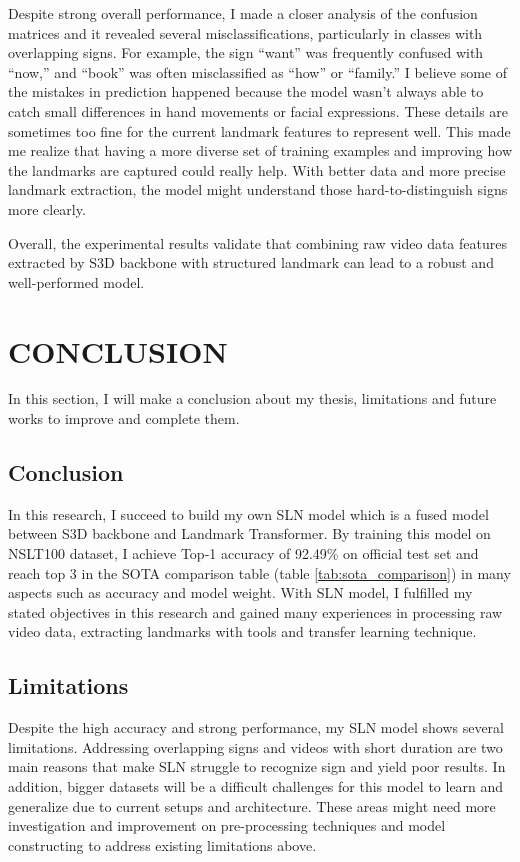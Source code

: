 \documentclass{article}
\begin{document}
\vspace{0.5cm}

Despite strong overall performance, I made a closer analysis of the confusion matrices and it revealed several misclassifications, particularly in classes with overlapping signs. For example, the sign “want” was frequently confused with “now,” and “book” was often misclassified as “how” or “family.” I believe some of the mistakes in prediction happened because the model wasn’t always able to catch small differences in hand movements or facial expressions. These details are sometimes too fine for the current landmark features to represent well. This made me realize that having a more diverse set of training examples and improving how the landmarks are captured could really help. With better data and more precise landmark extraction, the model might understand those hard-to-distinguish signs more clearly.

\vspace{0.5cm}

Overall, the experimental results validate that combining raw video data features extracted by S3D backbone \cite{xie2017rethinking} with structured landmark can lead to a robust and well-performed model.

\section{CONCLUSION}

In this section, I will make a conclusion about my thesis, limitations and future works to improve and complete them.

\subsection{Conclusion}
In this research, I succeed to build my own SLN model which is a fused model between S3D backbone and Landmark Transformer. By training this model on NSLT100 dataset, I achieve Top-1 accuracy of 92.49\% on official test set and reach top 3 in the SOTA comparison table (table \ref{tab:sota_comparison}) in many aspects such as accuracy and model weight. With SLN model, I fulfilled my stated objectives in this research and gained many experiences in processing raw video data, extracting landmarks with tools and transfer learning technique.

\subsection{Limitations}
Despite the high accuracy and strong performance, my SLN model shows several limitations. Addressing overlapping signs and videos with short duration are two main reasons that make SLN struggle to recognize sign and yield poor results. In addition, bigger datasets will be a difficult challenges for this model to learn and generalize due to current setups and architecture. These areas might need more investigation and improvement on pre-processing techniques and model constructing to address existing limitations above.
\end{document}
